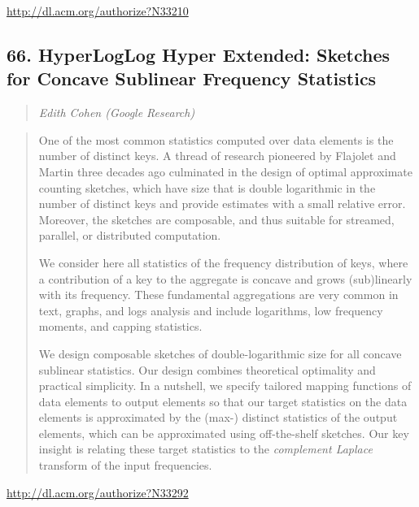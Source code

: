 \documentclass{article}
\begin{document}
\href{http://dl.acm.org/authorize?N33210}{http://dl.acm.org/authorize?N33210}

\subsection{66. HyperLogLog Hyper Extended: Sketches for Concave Sublinear   Frequency Statistics}

\begin{quote}
\footnotesize{\textit{Edith Cohen (Google Research)}}

\end{quote}

\begin{quote}
One of the most common statistics computed over data elements is the number of distinct keys. A thread of research pioneered by Flajolet and Martin three decades ago culminated in the design of optimal approximate counting sketches, which have size that is double logarithmic in the number of distinct keys and provide estimates with a small relative error. Moreover, the sketches are composable, and thus suitable for streamed, parallel, or distributed computation.







  We consider here all statistics of the frequency distribution of keys, where a contribution of a key to the aggregate is concave and grows (sub)linearly with its frequency. These fundamental aggregations are very common in text, graphs, and logs analysis and include logarithms, low frequency moments, and capping statistics.







  We design composable sketches of double-logarithmic size for all concave sublinear statistics. Our design combines theoretical optimality and practical simplicity. In a nutshell, we specify tailored mapping functions of data elements to output elements so that our target statistics on the data elements is approximated by the (max-) distinct statistics of the output elements, which can be approximated using off-the-shelf sketches. Our key insight is relating these target statistics to the {\em complement Laplace} transform of the input frequencies.
\end{quote}

\href{http://dl.acm.org/authorize?N33292}{http://dl.acm.org/authorize?N33292}
\end{document}
